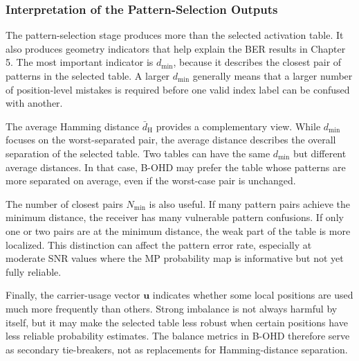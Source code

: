 \subsubsection{Interpretation of the Pattern-Selection Outputs}

The pattern-selection stage produces more than the selected activation table. It also produces geometry indicators that help explain the BER results in Chapter 5. The most important indicator is \(d_{\min}\), because it describes the closest pair of patterns in the selected table. A larger \(d_{\min}\) generally means that a larger number of position-level mistakes is required before one valid index label can be confused with another.

The average Hamming distance \(\bar{d}_{\mathrm{H}}\) provides a complementary view. While \(d_{\min}\) focuses on the worst-separated pair, the average distance describes the overall separation of the selected table. Two tables can have the same \(d_{\min}\) but different average distances. In that case, B-OHD may prefer the table whose patterns are more separated on average, even if the worst-case pair is unchanged.

The number of closest pairs \(N_{\min}\) is also useful. If many pattern pairs achieve the minimum distance, the receiver has many vulnerable pattern confusions. If only one or two pairs are at the minimum distance, the weak part of the table is more localized. This distinction can affect the pattern error rate, especially at moderate SNR values where the MP probability map is informative but not yet fully reliable.

Finally, the carrier-usage vector \(\mathbf{u}\) indicates whether some local positions are used much more frequently than others. Strong imbalance is not always harmful by itself, but it may make the selected table less robust when certain positions have less reliable probability estimates. The balance metrics in B-OHD therefore serve as secondary tie-breakers, not as replacements for Hamming-distance separation.

